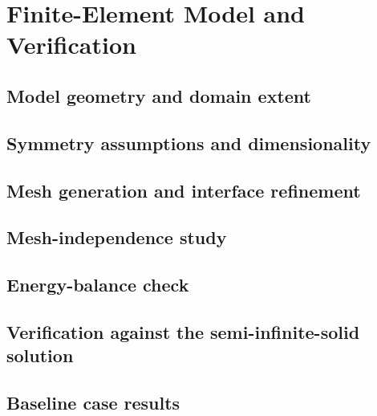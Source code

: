 \chapter{Finite-Element Model and Verification}

\section{Model geometry and domain extent}

\section{Symmetry assumptions and dimensionality}

\section{Mesh generation and interface refinement}

\section{Mesh-independence study}

\section{Energy-balance check}

\section{Verification against the semi-infinite-solid solution}

\section{Baseline case results}
